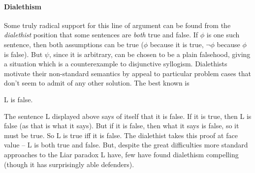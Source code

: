 \paragraph{Dialethism} Some truly radical support for this line of argument can be found from the \emph{dialethist} position that some sentences are \emph{both} true and false. If $\phi$ is one such sentence, then both assumptions can be true ($\phi$ because it is true, $\neg\phi$ because $\phi$ is false). But $\psi$, since it is arbitrary, can be chosen to be a plain falsehood, giving a situation  which is a counterexample to disjunctive syllogism. Dialethists motivate their non-standard semantics by appeal to particular problem cases that don't seem to admit of any other solution. The best known is \begin{exe}
	 L is false.
\end{exe} The sentence L displayed above says of itself that it is false. If it is true, then L is false (as that is what it says). But if it is false, then what it says is false, so it must be true. So L is true iff it is false. The dialethist takes this proof at face value – L is both true and false. But, despite the great difficulties more standard approaches to the Liar paradox L have, few have found dialethism compelling (though it has surprisingly able defenders). 

